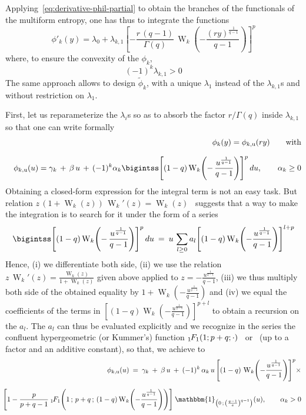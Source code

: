 \documentclass[entropy,article,submit,moreauthors,pdftex]{Definitions/mdpi}
\def\un{\mathbbm{1}}%
\def\W{\operatorname{W}} %
\newcommand{\hypgeom}[2]{\mbox{}_{#1}\hspace{-1pt}F_{#2}}%
\def\u{\mathrm{u}}
\begin{document}
Applying~\eqref{eq:derivative-phil-partial}  to  obtain   the  branches  of  the
functionals of the multiform entropy, one has thus to integrate the functions
%
\[
\phi'_k(y) = \lambda_0 + \lambda_{k,1}  \left[ - \frac{r \, (q-1)}{\Gamma(q)} \,
  \W_k\left( - \frac{\left( r y \right)^{\frac{1}{q-1}}}{q-1} \right) \right]^p
\]
%
where, to ensure the convexity of the $\phi_k$,
%
\[
(-1)^k \lambda_{k,1} > 0
\]
%
The  same  approach  allows  to   design  $\widetilde{\phi}_k$,  with  a  unique
$\lambda_1$  instead   of  the  $\lambda_{k,1}$s  and   without  restriction  on
$\lambda_1$.

First,  let us  reparameterize  the  $\lambda_i$s so  as  to  absorb the  factor
$r/\Gamma(q)$ inside $\lambda_{k,1}$ so that one can write formally
%
\begin{eqnarray*}
&&\phi_k(y) = \phi_{k,\u}(r y)  \qquad \mbox{with}
\\[2.5mm]
&& \phi_{k,\u}(u) = \gamma_k \, + \, \beta \, u \, + \, (-1)^k \alpha_k
\bigintss \left[ (1-q) \W_k\left( - \, \frac{u^{\frac{1}{q-1}}}{q-1} \right)
  \right]^p \, du, \qquad \alpha_k \ge 0
\end{eqnarray*}
%
Obtaining a  closed-form expression for the  integral term is not  an easy task.
But relation  $z \, (1+\W_k(z)) \,  \W_k'(z) = \W_k(z)$~\cite[Eq.~3.2]{CorGon96}
suggests that a way  to make the integration is to search for  it under the form
of a series
%
\[
\bigintss  \left[ (1-q)  \W_k\left( -  \, \frac{u^{\frac{1}{q-1}}}{q-1}  \right)
  \right]^p \,  du \: =  \: u \,  \sum_{l \ge 0}  a_l \left[ (1-q)  \W_k\left( -
  \frac{u^{\frac{1}{q-1}}}{q-1} \right) \right]^{l+p}
\]
%
Hence, (i) we differentiate both side, (ii) we use the relation $z \, \W_k'(z) =
\frac{\W_k(z)}{1+\W_k(z)}$     given      above     applied     to      $z     =
-\frac{u^{\frac{1}{q-1}}}{q-1}$,  (iii)  we  thus  multiply  both  side  of  the
obtained equality by $1+\W_k\left(  - \frac{u^{\frac{1}{q-1}}}{q-1} \right)$ and
(iv)  we equal  the coefficients  of  the terms  in $\left[  (1-q) \W_k\left(  -
  \frac{u^{\frac{1}{q-1}}}{q-1} \right) \right]^{p+l}$ to  obtain a recursion on
the $a_l$. The  $a_l$ can thus be  evaluated explicitly and we  recognize in the
series the  confluent hypergeometric (or Kummer's)  function $\hypgeom{1}{1}(1 ;
p+q ; \cdot)$~\cite[Eq.~13.1.2]{AbrSte70} or~\cite[Eq.~9.210-1]{GraRyz15} (up to
a factor and an additive constant), so that, we achieve to
%
\begin{eqnarray*}
  &&\phi_{k,\u}(u) \: = \: \gamma_k \: + \: \beta \, u \: + \: (-1)^k \,
  \alpha_k \, u \, \left[ (1-q) \, \W_k\left( - \frac{u^{\frac{1}{q-1}}}{q-1}
    \right) \right]^p \times
  \\[2.5mm]
  &&\hspace{-5mm}\left[ 1 - \frac{p}{p+q-1} \: \hypgeom{1}{1}\left( 1 \, ; \,
    p+q \, ; \, (1-q) \W_k \left( - \frac{u^{\frac{1}{q-1}}}{q-1} \right)
    \right) \right] \: \un_{\left( 0 \, ; \, \left( \frac{q-1}{e} \right)^{q-1}
    \right)}(u), \qquad \alpha_k > 0
\end{eqnarray*}
\end{document}

